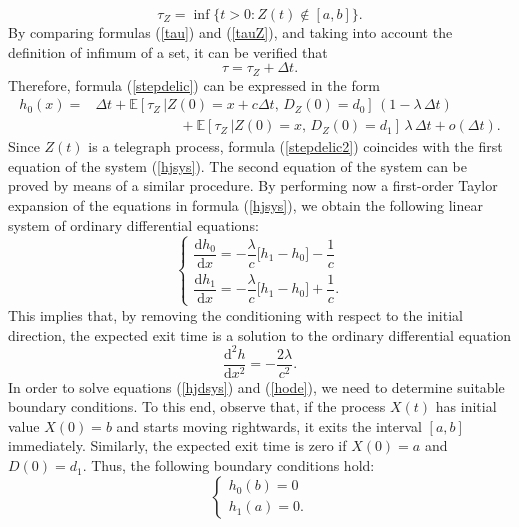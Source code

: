 \documentclass{article}
\begin{document}
\begin{equation}\label{tauZ}\tau_Z=\inf\{t>0: Z(t)\notin [a,b]\}.\end{equation}
By comparing formulas (\ref{tau}) and (\ref{tauZ}), and taking into account the definition of infimum of a set, it can be verified that
$$\tau=\tau_Z+\Delta t.$$
Therefore, formula (\ref{stepdelic}) can be expressed in the form
\begin{align}
h_0(x)=&\Delta t+\mathbb{E}\left[\tau_Z\,\Big\lvert Z(0)=x+c\Delta t,\,D_Z(0)=d_0\right]\,(1-\lambda\,\Delta t)\nonumber\\
&\qquad\qquad\qquad+\mathbb{E}\left[\tau_Z\,\Big\lvert Z(0)=x,\,D_Z(0)=d_1\right]\,\lambda\,\Delta t+o(\Delta t).\label{stepdelic2}
\end{align}
Since $Z(t)$ is a telegraph process, formula (\ref{stepdelic2}) coincides with the first equation of the system (\ref{hjsys}). The second equation of the system can be proved by means of a similar procedure. By performing now a first-order Taylor expansion of the equations in formula  (\ref{hjsys}), we obtain the following linear system of ordinary differential equations:
\begin{equation}\label{hjdsys}
\begin{cases}
\dfrac{\mathrm{d} h_0}{\mathrm{d}x}=-\dfrac{\lambda}{c}\big[h_1-h_0\big]-\dfrac{1}{c}\\[0.75em]
\dfrac{\mathrm{d} h_1}{\mathrm{d}x}=-\dfrac{\lambda}{c}\big[h_1-h_0\big]+\dfrac{1}{c}.
\end{cases}
\end{equation}
This implies that, by removing the conditioning with respect to the initial direction, the expected exit time is a solution to the ordinary differential equation
\begin{equation}\label{hode}\dfrac{\mathrm{d}^2 h}{\mathrm{d}x^2}=-\frac{2\lambda}{c^2}.\end{equation}
\noindent In order to solve equations (\ref{hjdsys}) and (\ref{hode}), we need to determine suitable boundary conditions. To this end, observe that, if the process $X(t)$ has initial value $X(0)=b$ and starts moving rightwards, it exits the interval $[a,b]$ immediately. Similarly, the expected exit time is zero if $X(0)=a$ and $D(0)=d_1$. Thus, the following boundary conditions hold:
\begin{equation}\label{hboundcond}
\begin{cases}
h_0(b)=0\\
h_1(a)=0.
\end{cases}
\end{equation} 
\end{document}
